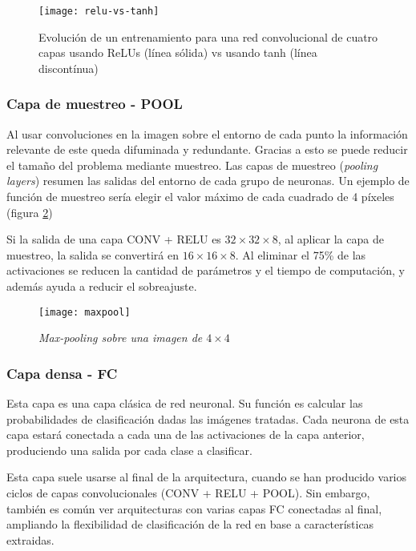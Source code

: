 \begin{figure}
    \centering
    \caption{Evolución de un entrenamiento para una red convolucional de cuatro capas usando ReLUs (línea sólida) vs usando tanh (línea discontínua) \parencite{krizhevsky2012imagenet}}
  \label{relu-vs-tanh}
  \texttt{[image: relu-vs-tanh]}
\end{figure}

\subsubsection{Capa de muestreo - POOL}

Al usar convoluciones en la imagen sobre el entorno de cada punto la información relevante de este queda difuminada y redundante. Gracias a esto se puede reducir el tamaño del problema mediante muestreo.
Las capas de muestreo (\textit{pooling layers}) resumen las salidas del entorno de cada grupo de neuronas. Un ejemplo de función de muestreo sería elegir el valor máximo de cada cuadrado de 4 píxeles (figura \ref{maxpool})

Si la salida de una capa CONV + RELU es $32 \times 32 \times 8$, al aplicar la capa de muestreo, la salida se convertirá en $16 \times 16 \times 8$. Al eliminar el 75\% de las activaciones se reducen la cantidad de parámetros y el tiempo de computación, y además ayuda a reducir el sobreajuste.

\begin{figure}
    \centering
    \caption{\textit{Max-pooling sobre una imagen de $4\times4$}}
  \label{maxpool}
  \texttt{[image: maxpool]}
\end{figure}

\subsubsection{Capa densa - FC}

Esta capa es una capa clásica de red neuronal. Su función es calcular las probabilidades de clasificación dadas las imágenes tratadas. Cada neurona de esta capa estará conectada a cada una de las activaciones de la capa anterior, produciendo una salida por cada clase a clasificar.

Esta capa suele usarse al final de la arquitectura, cuando se han producido varios ciclos de capas convolucionales (CONV + RELU + POOL). Sin embargo, también es común ver arquitecturas con varias capas FC conectadas al final, ampliando la flexibilidad de clasificación de la red en base a características extraidas.
